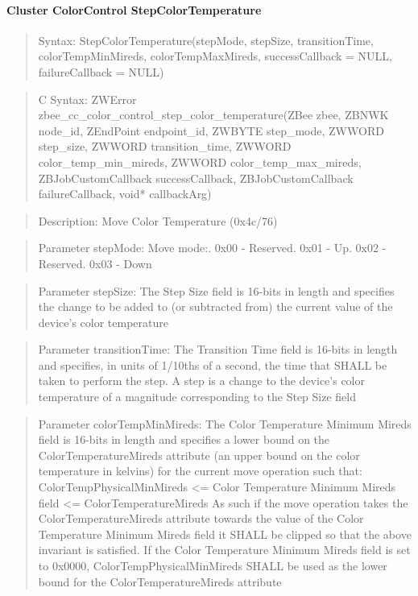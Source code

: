 \paragraph{Cluster ColorControl StepColorTemperature}
\begin{quote}Syntax: StepColorTemperature(stepMode, stepSize, transitionTime, colorTempMinMireds, colorTempMaxMireds, successCallback = NULL, failureCallback = NULL)\end{quote}
\begin{quote}C Syntax: ZWError zbee\_cc\_color\_control\_step\_color\_temperature(ZBee zbee, ZBNWK node\_id, ZEndPoint endpoint\_id, ZWBYTE step\_mode, ZWWORD step\_size, ZWWORD transition\_time, ZWWORD color\_temp\_min\_mireds, ZWWORD color\_temp\_max\_mireds, ZBJobCustomCallback successCallback, ZBJobCustomCallback failureCallback, void* callbackArg)\end{quote}
\begin{quote}Description: Move Color Temperature (0x4c/76)\end{quote}
\begin{quote}Parameter stepMode: Move mode:. 0x00 - Reserved. 0x01 - Up. 0x02 - Reserved. 0x03 - Down\end{quote}
\begin{quote}Parameter stepSize: The Step Size field is 16-bits in length and specifies the change to be added to (or subtracted from) the current value of the device’s color temperature\end{quote}
\begin{quote}Parameter transitionTime: The Transition Time field is 16-bits in length and specifies, in units of 1/10ths of a second, the time that SHALL be taken to perform the step. A step is a change to the device’s color temperature of a magnitude corresponding to the Step Size field\end{quote}
\begin{quote}Parameter colorTempMinMireds: The Color Temperature Minimum Mireds field is 16-bits in length and specifies a lower bound on the ColorTemperatureMireds attribute (an upper bound on the color temperature in kelvins) for the current move operation such that: ColorTempPhysicalMinMireds <= Color Temperature Minimum Mireds field <= ColorTemperatureMireds As such if the move operation takes the ColorTemperatureMireds attribute towards the value of the Color Temperature Minimum Mireds field it SHALL be clipped so that the above invariant is satisfied. If the Color Temperature Minimum Mireds field is set to 0x0000, ColorTempPhysicalMinMireds SHALL be used as the lower bound for the ColorTemperatureMireds attribute\end{quote}
